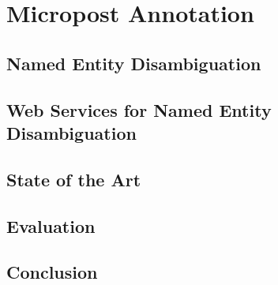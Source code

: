 

\chapter{Micropost Annotation}

\ifpdf
    \graphicspath{{4_micropost_annotation/figures/PNG/}{4_micropost_annotation/figures/PDF/}{4_micropost_annotation/figures/}}
\else
    \graphicspath{{4_micropost_annotation/figures/EPS/}{4_micropost_annotation/figures/}}
\fi


\section{Named Entity Disambiguation}

\section{Web Services for Named Entity Disambiguation}

\section{State of the Art}

\section{Evaluation}

\section{Conclusion}